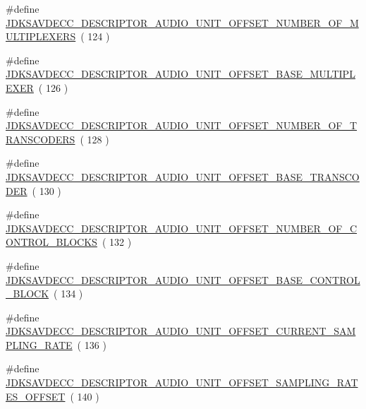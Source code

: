 \begin{DoxyCompactItemize}
\#define \hyperlink{group__descriptor__audio_ga9a276a262db8209c9db6c2878e280b0b}{J\+D\+K\+S\+A\+V\+D\+E\+C\+C\+\_\+\+D\+E\+S\+C\+R\+I\+P\+T\+O\+R\+\_\+\+A\+U\+D\+I\+O\+\_\+\+U\+N\+I\+T\+\_\+\+O\+F\+F\+S\+E\+T\+\_\+\+N\+U\+M\+B\+E\+R\+\_\+\+O\+F\+\_\+\+M\+U\+L\+T\+I\+P\+L\+E\+X\+E\+RS}~( 124 )
\item 
\#define \hyperlink{group__descriptor__audio_ga09d7d0552ef89b2a348419a712bb7ad4}{J\+D\+K\+S\+A\+V\+D\+E\+C\+C\+\_\+\+D\+E\+S\+C\+R\+I\+P\+T\+O\+R\+\_\+\+A\+U\+D\+I\+O\+\_\+\+U\+N\+I\+T\+\_\+\+O\+F\+F\+S\+E\+T\+\_\+\+B\+A\+S\+E\+\_\+\+M\+U\+L\+T\+I\+P\+L\+E\+X\+ER}~( 126 )
\item 
\#define \hyperlink{group__descriptor__audio_ga5742393ce581bcfe19485a9c6922869f}{J\+D\+K\+S\+A\+V\+D\+E\+C\+C\+\_\+\+D\+E\+S\+C\+R\+I\+P\+T\+O\+R\+\_\+\+A\+U\+D\+I\+O\+\_\+\+U\+N\+I\+T\+\_\+\+O\+F\+F\+S\+E\+T\+\_\+\+N\+U\+M\+B\+E\+R\+\_\+\+O\+F\+\_\+\+T\+R\+A\+N\+S\+C\+O\+D\+E\+RS}~( 128 )
\item 
\#define \hyperlink{group__descriptor__audio_ga2a332588af83546a24c11d5346a4a439}{J\+D\+K\+S\+A\+V\+D\+E\+C\+C\+\_\+\+D\+E\+S\+C\+R\+I\+P\+T\+O\+R\+\_\+\+A\+U\+D\+I\+O\+\_\+\+U\+N\+I\+T\+\_\+\+O\+F\+F\+S\+E\+T\+\_\+\+B\+A\+S\+E\+\_\+\+T\+R\+A\+N\+S\+C\+O\+D\+ER}~( 130 )
\item 
\#define \hyperlink{group__descriptor__audio_gab1cffd6a5961b162210ca14b1d780c00}{J\+D\+K\+S\+A\+V\+D\+E\+C\+C\+\_\+\+D\+E\+S\+C\+R\+I\+P\+T\+O\+R\+\_\+\+A\+U\+D\+I\+O\+\_\+\+U\+N\+I\+T\+\_\+\+O\+F\+F\+S\+E\+T\+\_\+\+N\+U\+M\+B\+E\+R\+\_\+\+O\+F\+\_\+\+C\+O\+N\+T\+R\+O\+L\+\_\+\+B\+L\+O\+C\+KS}~( 132 )
\item 
\#define \hyperlink{group__descriptor__audio_gaf3eb9bc1a72e88a7a1e92281023e25c4}{J\+D\+K\+S\+A\+V\+D\+E\+C\+C\+\_\+\+D\+E\+S\+C\+R\+I\+P\+T\+O\+R\+\_\+\+A\+U\+D\+I\+O\+\_\+\+U\+N\+I\+T\+\_\+\+O\+F\+F\+S\+E\+T\+\_\+\+B\+A\+S\+E\+\_\+\+C\+O\+N\+T\+R\+O\+L\+\_\+\+B\+L\+O\+CK}~( 134 )
\item 
\#define \hyperlink{group__descriptor__audio_ga384cc1c6edc88db4c1f7b071cf592e6a}{J\+D\+K\+S\+A\+V\+D\+E\+C\+C\+\_\+\+D\+E\+S\+C\+R\+I\+P\+T\+O\+R\+\_\+\+A\+U\+D\+I\+O\+\_\+\+U\+N\+I\+T\+\_\+\+O\+F\+F\+S\+E\+T\+\_\+\+C\+U\+R\+R\+E\+N\+T\+\_\+\+S\+A\+M\+P\+L\+I\+N\+G\+\_\+\+R\+A\+TE}~( 136 )
\item 
\#define \hyperlink{group__descriptor__audio_ga8e06e3f971208f18d53b3d67bf426fc4}{J\+D\+K\+S\+A\+V\+D\+E\+C\+C\+\_\+\+D\+E\+S\+C\+R\+I\+P\+T\+O\+R\+\_\+\+A\+U\+D\+I\+O\+\_\+\+U\+N\+I\+T\+\_\+\+O\+F\+F\+S\+E\+T\+\_\+\+S\+A\+M\+P\+L\+I\+N\+G\+\_\+\+R\+A\+T\+E\+S\+\_\+\+O\+F\+F\+S\+ET}~( 140 )

\end{DoxyCompactItemize}
